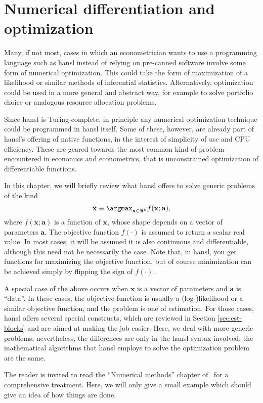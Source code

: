 \section{Numerical differentiation and optimization}

Many, if not most, cases in which an econometrician wants to use a
programming language such as hansl instead of relying on pre-canned
software involve some form of numerical optimization. This could take
the form of maximization of a likelihood or similar methods of
inferential statistics. Alternatively, optimization could be used in a
more general and abstract way, for example to solve portfolio choice
or analogous resource allocation problems.

Since hansl is Turing-complete, in principle any numerical
optimization technique could be programmed in hansl itself. Some of
these, however, are already part of hansl's offering of native
functions, in the interest of simplicity of use and CPU
efficiency. These are geared towards the most common kind of problem
encountered in economics and econometrics, that is unconstrained
optimization of differentiable functions.

In this chapter, we will briefly review what hansl offers to solve
generic problems of the kind
\[
\hat{\mathbf{x}} \equiv \argmax_{\mathbf{x} \in \Re^k} f(\mathbf{x}; \mathbf{a}),
\]
where $f(\mathbf{x}; \mathbf{a})$ is a function of $\mathbf{x}$, whose
shape depends on a vector of parameters $\mathbf{a}$. The objective
function $f(\cdot)$ is assumed to return a scalar real value. In most
cases, it will be assumed it is also continuous and differentiable,
although this need not be necessarily the case. Note that, in hansl,
you get functions for maximizing the objective function, but of course
minimization can be achieved simply by flipping the sign of
$f(\cdot)$.

A special case of the above occurs when $\mathbf{x}$ is a vector of
parameters and $\mathbf{a}$ is ``data''. In these cases, the objective
function is usually a (log-)likelihood or a similar objective
function, and the problem is one of estimation. For those cases, hansl
offers several special constructs, which are reviewed in Section
\ref{sec:est-blocks} and are aimed at making the job easier. Here, we
deal with more generic problems; nevertheless, the differences are
only in the hansl syntax involved: the mathematical algorithms that
hansl employs to solve the optimization problem are the same.

The reader is invited to read the ``Numerical methods'' chapter of
\GUG\ for a comprehensive treatment. Here, we will only give a small
example which should give an idea of how things are done.

